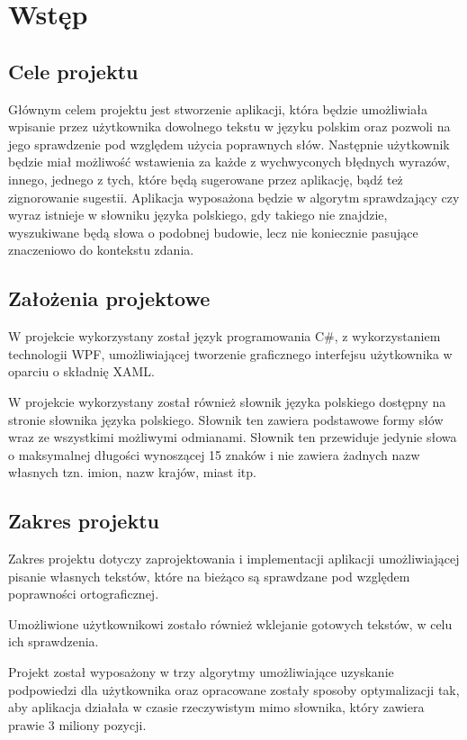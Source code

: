 \chapter{Wstęp}

\section{Cele projektu}

Głównym celem projektu jest stworzenie aplikacji, która będzie umożliwiała wpisanie przez użytkownika dowolnego tekstu w języku polskim oraz pozwoli na jego sprawdzenie pod względem użycia poprawnych słów. Następnie użytkownik będzie miał możliwość wstawienia za każde z wychwyconych błędnych wyrazów, innego, jednego z tych, które będą sugerowane przez aplikację, bądź też zignorowanie sugestii. Aplikacja wyposażona będzie w algorytm sprawdzający czy wyraz istnieje w słowniku języka polskiego, gdy takiego nie znajdzie, wyszukiwane będą słowa o podobnej budowie, lecz nie koniecznie pasujące znaczeniowo do kontekstu zdania.

\section{Założenia projektowe}

W projekcie wykorzystany został język programowania C\#, z wykorzystaniem technologii WPF, umożliwiającej tworzenie graficznego interfejsu użytkownika w oparciu o składnię XAML.

W projekcie wykorzystany został również słownik języka polskiego dostępny na stronie słownika języka polskiego. Słownik ten zawiera podstawowe formy słów wraz ze wszystkimi możliwymi odmianami. Słownik ten przewiduje jedynie słowa o maksymalnej długości wynoszącej 15 znaków i nie zawiera żadnych nazw własnych tzn. imion, nazw krajów, miast itp.

\section{Zakres projektu}
Zakres projektu dotyczy zaprojektowania i implementacji aplikacji umożliwiającej pisanie własnych tekstów, które na bieżąco są sprawdzane pod względem poprawności ortograficznej.

Umożliwione użytkownikowi zostało również wklejanie gotowych tekstów, w celu ich sprawdzenia.

Projekt został wyposażony w trzy algorytmy umożliwiające uzyskanie podpowiedzi dla użytkownika oraz opracowane zostały sposoby optymalizacji tak, aby aplikacja działała w czasie rzeczywistym mimo słownika, który zawiera prawie 3 miliony pozycji.

